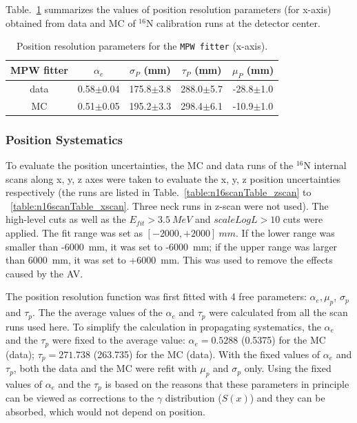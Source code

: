 Table.~\ref{tab:posresol} summarizes the values of position resolution parameters (for x-axis) obtained from data and MC of {$^{16}$}N calibration runs at the detector center.
\vspace{1mm}
\begin{table}[ht]
	\centering
	\caption{Position resolution parameters for the \texttt{MPW fitter} (x-axis).}
	\label{tab:posresol}
	\begin{tabular}{ccccc}
		\toprule
		MPW fitter & $\alpha_e$ & $\sigma_P$ (mm) &  $\tau_P$ (mm)& $\mu_P$ (mm)\\
		\hline 
		data& 0.58$\pm$0.04 & 175.8$\pm$3.8 & 288.0$\pm$5.7 & -28.8$\pm$1.0\\	
		\hline 
		MC & 0.51$\pm$0.05 & 195.2$\pm$3.3 & 298.4$\pm$6.1 & -10.9$\pm$1.0\\
		\bottomrule
	\end{tabular}
\end{table}
\vspace{1mm}

\subsubsection{Position Systematics}
To evaluate the position uncertainties, the MC and data runs of the $^{16}$N internal scans along x, y, z axes were taken to evaluate the x, y, z position uncertainties respectively (the runs are listed in Table.~\ref{table:n16scanTable_zscan} to ~\ref{table:n16scanTable_xscan}. Three neck runs in z-scan were not used). The high-level cuts as well as the $E_{fit}>3.5~MeV$ and $scaleLogL>10$ cuts were applied. The fit range was set as $[-2000, +2000]~mm$. If the lower range was smaller than -6000~mm, it was set to -6000~mm; if the upper range was larger than 6000~mm, it was set to +6000~mm. This was used to remove the effects caused by the AV.

The position resolution function was first fitted with 4 free parameters: $\alpha_e,\mu_p$, $\sigma_p$ and $\tau_p$. The the average values of the $\alpha_e$ and $\tau_p$ were calculated from all the scan runs used here. To simplify the calculation in propagating systematics, the $\alpha_e$ and the $\tau_p$ were fixed to the average value: $\alpha_e=0.5288$ (0.5375) for the MC (data); $\tau_p=271.738$ (263.735) for the MC (data). With the fixed values of $\alpha_e$ and $\tau_p$, both the data and the MC were refit with $\mu_p$ and $\sigma_p$ only. Using the fixed values of $\alpha_e$ and the $\tau_p$ is based on the reasons that these parameters in principle can be viewed as corrections to the $\gamma$ distribution ($S(x)$) and they can be absorbed, which would not depend on position\cite{waterunidoc}. 

